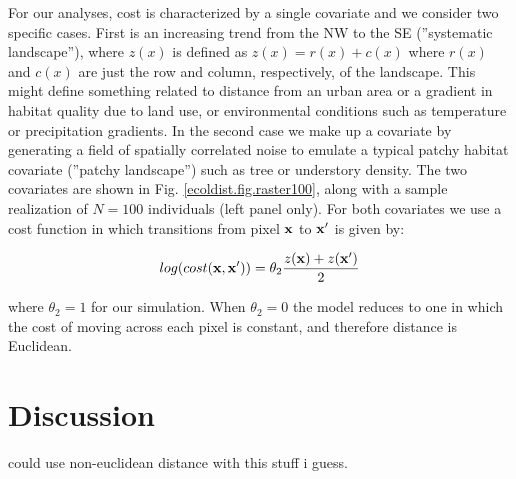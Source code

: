 \documentclass[12pt]{article}
\begin{document}
\begin{spacing}{1.8}
For our analyses, cost is characterized by a single covariate 
and we consider two specific cases. First is an increasing trend from
the NW to the SE (''systematic landscape''), where $z(x)$ is defined as
$z(x) = r(x) + c(x)$ where $r(x)$ and $c(x)$ are just the row and
column, respectively, of the landscape.  This might define something
related to distance from an urban area or a gradient in habitat
quality due to land use, or environmental conditions such as
temperature or precipitation gradients.  In the second case we make up
a covariate by generating a field of spatially correlated noise to
emulate a typical patchy habitat covariate (''patchy landscape'') such as
tree or understory density. The two covariates are shown in
Fig. \ref{ecoldist.fig.raster100}, along with a sample realization of
$N=100$ individuals (left panel only).  For both covariates we use a
cost function in which transitions from pixel ${\bf x}$ to ${\bf x}'$
is given by:

\[
 log(cost({\bf x},{\bf x}'))=  \theta_2 \frac{z({\bf x}) + z({\bf x}')}{2}
\]

{\flushleft where} $\theta_2 = 1$ for our simulation.
When $\theta_2=0$ the
model reduces to one in which the cost of moving across each pixel is
constant, and therefore distance is Euclidean.






\section{Discussion}


could use non-euclidean distance with this stuff i guess.








\newpage





\end{spacing}
\end{document}
